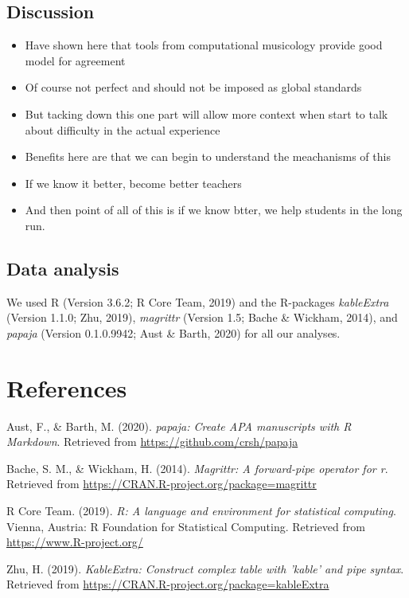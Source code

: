 \documentclass[english,man,floatsintext]{apa6}
\providecommand{\tightlist}{%
  \setlength{\itemsep}{0pt}\setlength{\parskip}{0pt}}
\begin{document}
\hypertarget{discussion}{%
\subsection{Discussion}\label{discussion}}

\begin{itemize}
\tightlist
\item
  Have shown here that tools from computational musicology provide good model for agreement
\item
  Of course not perfect and should not be imposed as global standards
\item
  But tacking down this one part will allow more context when start to talk about difficulty in the actual experience
\item
  Benefits here are that we can begin to understand the meachanisms of this
\item
  If we know it better, become better teachers
\item
  And then point of all of this is if we know btter, we help students in the long run.
\end{itemize}

\hypertarget{data-analysis}{%
\subsection{Data analysis}\label{data-analysis}}

We used R (Version 3.6.2; R Core Team, 2019) and the R-packages \emph{kableExtra} (Version 1.1.0; Zhu, 2019), \emph{magrittr} (Version 1.5; Bache \& Wickham, 2014), and \emph{papaja} (Version 0.1.0.9942; Aust \& Barth, 2020) for all our analyses.

\newpage

\hypertarget{references}{%
\section{References}\label{references}}

\begingroup
\setlength{\parindent}{-0.5in}
\setlength{\leftskip}{0.5in}

\hypertarget{refs}{}
\leavevmode\hypertarget{ref-R-papaja}{}%
Aust, F., \& Barth, M. (2020). \emph{papaja: Create APA manuscripts with R Markdown}. Retrieved from \url{https://github.com/crsh/papaja}

\leavevmode\hypertarget{ref-R-magrittr}{}%
Bache, S. M., \& Wickham, H. (2014). \emph{Magrittr: A forward-pipe operator for r}. Retrieved from \url{https://CRAN.R-project.org/package=magrittr}

\leavevmode\hypertarget{ref-R-base}{}%
R Core Team. (2019). \emph{R: A language and environment for statistical computing}. Vienna, Austria: R Foundation for Statistical Computing. Retrieved from \url{https://www.R-project.org/}

\leavevmode\hypertarget{ref-R-kableExtra}{}%
Zhu, H. (2019). \emph{KableExtra: Construct complex table with 'kable' and pipe syntax}. Retrieved from \url{https://CRAN.R-project.org/package=kableExtra}

\endgroup
\end{document}
